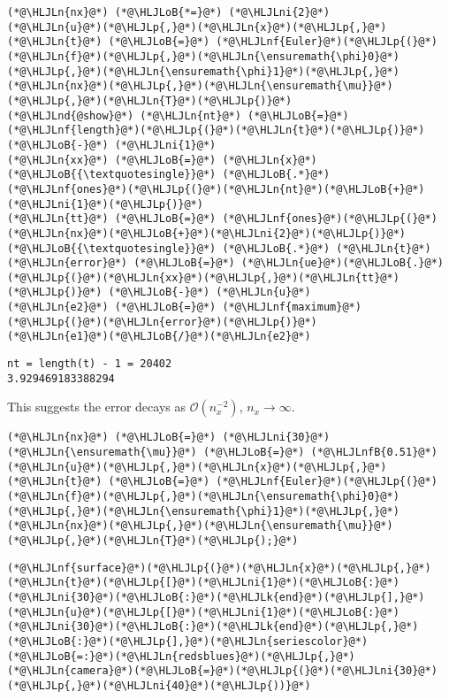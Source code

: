 \documentclass[12pt,landscape]{article}
\newcommand{\HLJLk}[1]{\textcolor[RGB]{148,91,176}{\textbf{#1}}}
\newcommand{\HLJLn}[1]{#1}
\newcommand{\HLJLnd}[1]{\textcolor[RGB]{214,102,97}{#1}}
\newcommand{\HLJLnf}[1]{\textcolor[RGB]{66,102,213}{#1}}
\newcommand{\HLJLnfB}[1]{\textcolor[RGB]{59,151,46}{#1}}
\newcommand{\HLJLni}[1]{\textcolor[RGB]{59,151,46}{#1}}
\newcommand{\HLJLoB}[1]{\textcolor[RGB]{102,102,102}{\textbf{#1}}}
\newcommand{\HLJLp}[1]{#1}
\begin{document}
{\begin{lstlisting}
(*@\HLJLn{nx}@*) (*@\HLJLoB{*=}@*) (*@\HLJLni{2}@*)
(*@\HLJLn{u}@*)(*@\HLJLp{,}@*)(*@\HLJLn{x}@*)(*@\HLJLp{,}@*)(*@\HLJLn{t}@*) (*@\HLJLoB{=}@*) (*@\HLJLnf{Euler}@*)(*@\HLJLp{(}@*)(*@\HLJLn{f}@*)(*@\HLJLp{,}@*)(*@\HLJLn{\ensuremath{\phi}0}@*)(*@\HLJLp{,}@*)(*@\HLJLn{\ensuremath{\phi}1}@*)(*@\HLJLp{,}@*)(*@\HLJLn{nx}@*)(*@\HLJLp{,}@*)(*@\HLJLn{\ensuremath{\mu}}@*)(*@\HLJLp{,}@*)(*@\HLJLn{T}@*)(*@\HLJLp{)}@*)
(*@\HLJLnd{@show}@*) (*@\HLJLn{nt}@*) (*@\HLJLoB{=}@*) (*@\HLJLnf{length}@*)(*@\HLJLp{(}@*)(*@\HLJLn{t}@*)(*@\HLJLp{)}@*) (*@\HLJLoB{-}@*) (*@\HLJLni{1}@*)
(*@\HLJLn{xx}@*) (*@\HLJLoB{=}@*) (*@\HLJLn{x}@*)(*@\HLJLoB{{\textquotesingle}}@*) (*@\HLJLoB{.*}@*) (*@\HLJLnf{ones}@*)(*@\HLJLp{(}@*)(*@\HLJLn{nt}@*)(*@\HLJLoB{+}@*)(*@\HLJLni{1}@*)(*@\HLJLp{)}@*)
(*@\HLJLn{tt}@*) (*@\HLJLoB{=}@*) (*@\HLJLnf{ones}@*)(*@\HLJLp{(}@*)(*@\HLJLn{nx}@*)(*@\HLJLoB{+}@*)(*@\HLJLni{2}@*)(*@\HLJLp{)}@*)(*@\HLJLoB{{\textquotesingle}}@*) (*@\HLJLoB{.*}@*) (*@\HLJLn{t}@*)
(*@\HLJLn{error}@*) (*@\HLJLoB{=}@*) (*@\HLJLn{ue}@*)(*@\HLJLoB{.}@*)(*@\HLJLp{(}@*)(*@\HLJLn{xx}@*)(*@\HLJLp{,}@*)(*@\HLJLn{tt}@*)(*@\HLJLp{)}@*) (*@\HLJLoB{-}@*) (*@\HLJLn{u}@*)
(*@\HLJLn{e2}@*) (*@\HLJLoB{=}@*) (*@\HLJLnf{maximum}@*)(*@\HLJLp{(}@*)(*@\HLJLn{error}@*)(*@\HLJLp{)}@*)
(*@\HLJLn{e1}@*)(*@\HLJLoB{/}@*)(*@\HLJLn{e2}@*)
\end{lstlisting}

\begin{lstlisting}
nt = length(t) - 1 = 20402
3.929469183388294
\end{lstlisting}


This suggests the error decays as $\mathcal{O}(n_x^{-2})$, $n_x \to \infty$.


\begin{lstlisting}
(*@\HLJLn{nx}@*) (*@\HLJLoB{=}@*) (*@\HLJLni{30}@*)
(*@\HLJLn{\ensuremath{\mu}}@*) (*@\HLJLoB{=}@*) (*@\HLJLnfB{0.51}@*)
(*@\HLJLn{u}@*)(*@\HLJLp{,}@*)(*@\HLJLn{x}@*)(*@\HLJLp{,}@*)(*@\HLJLn{t}@*) (*@\HLJLoB{=}@*) (*@\HLJLnf{Euler}@*)(*@\HLJLp{(}@*)(*@\HLJLn{f}@*)(*@\HLJLp{,}@*)(*@\HLJLn{\ensuremath{\phi}0}@*)(*@\HLJLp{,}@*)(*@\HLJLn{\ensuremath{\phi}1}@*)(*@\HLJLp{,}@*)(*@\HLJLn{nx}@*)(*@\HLJLp{,}@*)(*@\HLJLn{\ensuremath{\mu}}@*)(*@\HLJLp{,}@*)(*@\HLJLn{T}@*)(*@\HLJLp{);}@*)
\end{lstlisting}


\begin{lstlisting}
(*@\HLJLnf{surface}@*)(*@\HLJLp{(}@*)(*@\HLJLn{x}@*)(*@\HLJLp{,}@*)(*@\HLJLn{t}@*)(*@\HLJLp{[}@*)(*@\HLJLni{1}@*)(*@\HLJLoB{:}@*)(*@\HLJLni{30}@*)(*@\HLJLoB{:}@*)(*@\HLJLk{end}@*)(*@\HLJLp{],}@*)(*@\HLJLn{u}@*)(*@\HLJLp{[}@*)(*@\HLJLni{1}@*)(*@\HLJLoB{:}@*)(*@\HLJLni{30}@*)(*@\HLJLoB{:}@*)(*@\HLJLk{end}@*)(*@\HLJLp{,}@*)(*@\HLJLoB{:}@*)(*@\HLJLp{],}@*)(*@\HLJLn{seriescolor}@*)(*@\HLJLoB{=:}@*)(*@\HLJLn{redsblues}@*)(*@\HLJLp{,}@*) (*@\HLJLn{camera}@*)(*@\HLJLoB{=}@*)(*@\HLJLp{(}@*)(*@\HLJLni{30}@*)(*@\HLJLp{,}@*)(*@\HLJLni{40}@*)(*@\HLJLp{))}@*)
\end{lstlisting}

}
\end{document}
